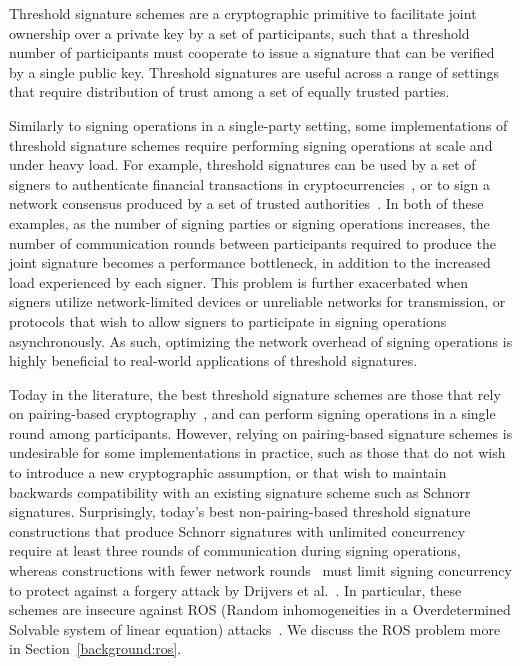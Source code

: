 
Threshold signature schemes are a cryptographic primitive to facilitate joint
ownership over a private key by a set of participants,
such that a threshold number of participants must cooperate to issue a
signature that can be verified by a single public key.
Threshold signatures are useful
across a range of settings that require distribution of trust among a set of equally trusted parties.

Similarly to signing operations in a single-party setting, some implementations
of threshold signature schemes require performing signing operations at
scale and under heavy load.
For example, threshold signatures can be used by a set of signers
to authenticate financial transactions in
cryptocurrencies~\cite{GoldfederGKBKFN19},
or to sign a
network consensus produced by a set of trusted authorities~\cite{MittalOTBG11}.
In both of these examples, as the number of signing parties or signing
operations increases, the number of communication rounds between participants required
to produce the joint signature becomes a performance bottleneck, in addition to
the increased load experienced by each signer.
This problem is further exacerbated
when signers utilize network-limited devices or unreliable networks for
transmission, or protocols that wish to allow signers to participate in signing
operations asynchronously.
As such, optimizing the
network overhead of signing operations is highly beneficial to real-world
applications of threshold signatures.

Today in the literature, the best threshold signature schemes are those that
rely on pairing-based
cryptography~\cite{BonehLS04,BDDMNG:CompactMultiSignatures}, and can perform
signing operations in a single round among participants. However, relying on
pairing-based signature schemes is undesirable for some implementations in
practice, such as those that do not wish to introduce a new
cryptographic assumption, or that wish to maintain backwards compatibility with
an existing signature scheme such as Schnorr signatures.
Surprisingly, today's best non-pairing-based threshold signature
constructions that produce Schnorr signatures with unlimited
concurrency~\cite{StinsonR01} require at
least three rounds of
communication during signing operations, whereas constructions with fewer
network rounds~\cite{GennaroJKR03} must limit signing
concurrency to protect against a forgery attack by Drijvers et al.~\cite{DrijversEFKLNS19}.
In particular,
these schemes are insecure against ROS (Random inhomogeneities in a Overdetermined
Solvable system of linear equation) attacks~\cite{DrijversEFKLNS19,BenhamoudaLLOR20}.
We discuss the ROS problem more in Section~\ref{background:ros}.

